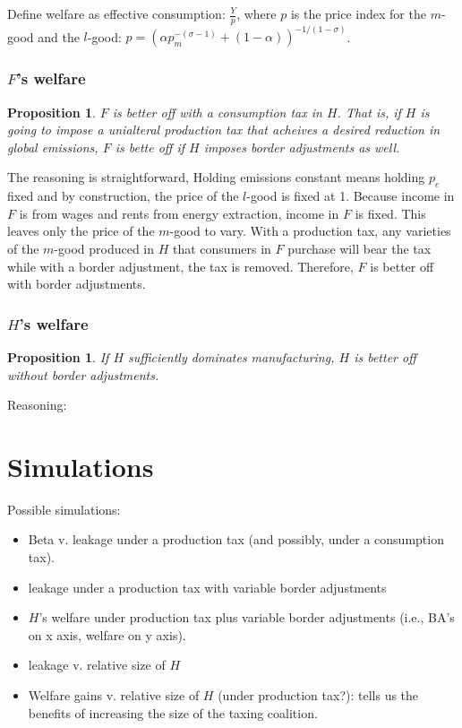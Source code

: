 \documentclass[notitlepage,12pt]{article}
\newtheorem{proposition}[theorem]{Proposition}
\begin{document}
Define welfare as effective consumption: $\frac{Y}{p}$, where $p$ is the
price index for the $m$-good and the $l$-good: $p=\left( \alpha
p_{m}^{-\left( \sigma -1\right) }+\left( 1-\alpha \right) \right)
^{-1/\left( 1-\sigma \right) }$.

\subsubsection{$F$'s welfare}

\begin{proposition}
$F$ is better off with a consumption tax in $H$. That is, if $H$ is going to
impose a unialteral production tax that acheives a desired reduction in
global emissions, $F$ is bette off if $H$ imposes border adjustments as well.
\end{proposition}

The reasoning is straightforward, Holding emissions constant means holding $%
p_{e}$ fixed and by construction, the price of the $l$-good is fixed at 1.
Because income in $F$ is from wages and rents from energy extraction, income
in $F$ is fixed. This leaves only the price of the $m$-good to vary. With a
production tax, any varieties of the $m$-good produced in $H$ that consumers
in $F$ purchase will bear the tax while with a border adjustment, the tax is
removed. Therefore, $F$ is better off with border adjustments.

\subsubsection{$H$'s welfare}

\begin{proposition}
If $H$ sufficiently dominates manufacturing, $H$ is better off without
border adjustments.
\end{proposition}

Reasoning:

\section{Simulations}

Possible simulations:

\begin{itemize}
\item Beta v. leakage under a production tax (and possibly, under a
consumption tax).

\item leakage under a production tax with variable border adjustments

\item $H$'s welfare under production tax plus variable border adjustments
(i.e., BA's on x axis, welfare on y axis).

\item leakage v. relative size of $H$

\item Welfare gains v. relative size of $H$ (under production tax?): tells
us the benefits of increasing the size of the taxing coalition.
\end{itemize}
\end{document}
